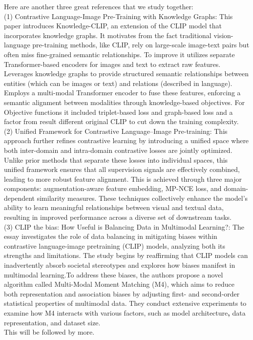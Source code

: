 \documentclass[11pt,letterpaper]{article}
\begin{document}
Here are another three great references that we study together:\\
(1) Contrastive Language-Image Pre-Training with Knowledge Graphs:
\cite{pan2022contrastivelanguageimagepretrainingknowledge}
This paper introduces Knowledge-CLIP, an extension of the CLIP model that incorporates knowledge graphs. It motivates from the fact traditional vision-language pre-training methods, like CLIP, rely on large-scale image-text pairs but often miss fine-grained semantic relationships.
To improve it utilizes separate Transformer-based encoders for images and text to extract raw features. Leverages knowledge graphs to provide structured semantic relationships between entities (which can be images or text) and relations (described in language).
Employs a multi-modal Transformer encoder to fuse these features, enforcing a semantic alignment between modalities through knowledge-based objectives.  For Objective functions it included triplet-based loss and graph-based loss and a factor from result different original CLIP to cut down the training complexity.\\
(2) Unified Framework for Contrastive Language–Image Pre-training\cite{lee2022uniclipunifiedframeworkcontrastive}:
This approach further refines contrastive learning by introducing a unified space where both inter-domain and intra-domain contrastive losses are jointly optimized. Unlike prior methods that separate these losses into individual spaces, this unified framework ensures that all supervision signals are effectively combined, leading to more robust feature alignment. This is achieved through three major components: augmentation-aware feature embedding, MP-NCE loss, and domain-dependent similarity measures. These techniques collectively enhance the model’s ability to learn meaningful relationships between visual and textual data, resulting in improved performance across a diverse set of downstream tasks.\\
(3) CLIP the bias:  How Useful is Balancing Data in Multimodal Learning?\cite{alabdulmohsin2024clipbiasusefulbalancing}:
The essay investigates the role of data balancing in mitigating biases within contrastive language-image pretraining (CLIP) models, analyzing both its strengths and limitations. The study begins by reaffirming that CLIP models can inadvertently absorb societal stereotypes and explores how biases manifest in multimodal learning.To address these biases, the authors propose a novel algorithm called Multi-Modal Moment Matching (M4), which aims to reduce both representation and association biases by adjusting first- and second-order statistical properties of multimodal data. They conduct extensive experiments to examine how M4 interacts with various factors, such as model architecture\textbf{, }data representation, and dataset size.\\
This will be followed by more.
\end{document}
